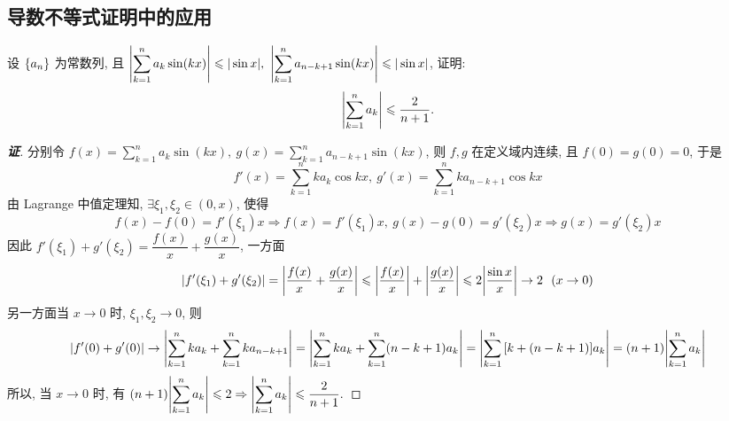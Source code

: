 \subsection{导数不等式证明中的应用}

\begin{example}
    设 $\qty{a_n}$ 为常数列, 且 $\displaystyle\qty|\sum_{k=1}^{n}a_k\sin(kx)|\leqslant |\sin x|,~\qty|\sum_{k=1}^{n}a_{n-k+1}\sin(kx)|\leqslant |\sin x|$, 证明: $$\displaystyle \qty|\sum_{k=1}^{n}a_k|\leqslant \dfrac{2}{n+1}.$$
\end{example}
\begin{proof}[{\songti \textbf{证}}]
    分别令 $\displaystyle f(x)=\sum_{k=1}^{n}a_k\sin(kx),~g(x)=\sum_{k=1}^{n}a_{n-k+1}\sin(kx)$, 则 $f,g$ 在定义域内连续, 且 $f(0)=g(0)=0$, 于是
    $$f'(x)=\sum_{k=1}^{n}ka_k\cos kx,~g'(x)=\sum_{k=1}^{n}ka_{n-k+1}\cos kx$$
    由 Lagrange 中值定理知, $\exists\xi_1,\xi_2\in(0,x)$, 使得
    $$f(x)-f(0)=f'(\xi_1)x\Rightarrow f(x)=f'(\xi_1)x,~g(x)-g(0)=g'(\xi_2)x\Rightarrow g(x)=g'(\xi_2)x$$
    因此 $f'(\xi_1)+g'(\xi_2)=\dfrac{f(x)}{x}+\dfrac{g(x)}{x}$, 一方面
    $$\qty|f'(\xi_1)+g'(\xi_2)|=\qty|\dfrac{f(x)}{x}+\dfrac{g(x)}{x}|\leqslant \qty|\dfrac{f(x)}{x}|+\qty|\dfrac{g(x)}{x}|\leqslant 2\qty|\dfrac{\sin x}{x}|\to 2~~(x\to0)$$
    另一方面当 $x\to0$ 时, $\xi_1,\xi_2\to0$, 则
    $$\qty|f'(0)+g'(0)|\to\qty|\sum_{k=1}^{n}ka_k+\sum_{k=1}^{n}ka_{n-k+1}|=\qty|\sum_{k=1}^{n}ka_k+\sum_{k=1}^{n}(n-k+1)a_k|=\qty|\sum_{k=1}^{n}\qty[k+(n-k+1)]a_k|=(n+1)\qty|\sum_{k=1}^{n}a_k|$$
    所以, 当 $x\to0$ 时, 有 $\displaystyle (n+1)\qty|\sum_{k=1}^{n}a_k|\leqslant 2\Rightarrow \qty|\sum_{k=1}^{n}a_k|\leqslant \dfrac{2}{n+1}.$
\end{proof}
